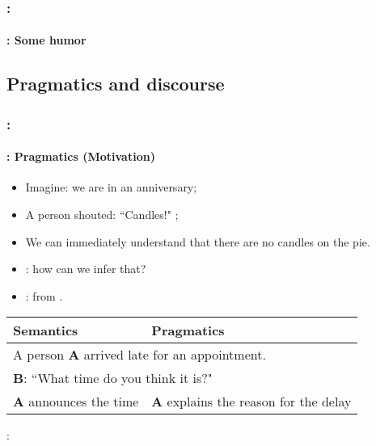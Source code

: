 \documentclass[xcolor=table]{beamer}
\begin{document}
\begin{frame}
	\frametitle{\insertshortsubtitle: \insertsection}
	\framesubtitle{\insertsubsection: Some humor}

	\begin{center}
	\end{center}

\end{frame}

\subsection{Pragmatics and discourse}

\begin{frame}
	\frametitle{\insertshortsubtitle: \insertsection}
	\framesubtitle{\insertsubsection: Pragmatics (Motivation)}

	\begin{minipage}{0.7\textwidth}
	\begin{itemize}
		\item Imagine: we are in an anniversary;
		\item A person shouted: ``Candles!" ;
		\item We can immediately understand that there are no candles on the pie.
		\item {}: how can we infer that?
		\item {}: from .
	\end{itemize}
	\end{minipage}
	\begin{minipage}{0.28\textwidth}
	\end{minipage}
	
	\vfill
	\begin{tabular}{|p{}|p{}|}
		\hline
		\bfseries Semantics & \bfseries Pragmatics \\
		\hline 
		\multicolumn{2}{|l|}{A person \textbf{A} arrived late for an appointment.} \\
		\multicolumn{2}{|l|}{\textbf{B}: ``What time do you think it is?"} \\
		\hline 
		\textbf{A} announces the time &  \textbf{A} explains the reason for the delay \\
		\hline
	\end{tabular}
	
	\vfill 
	
	: 

\end{frame}
\end{document}
